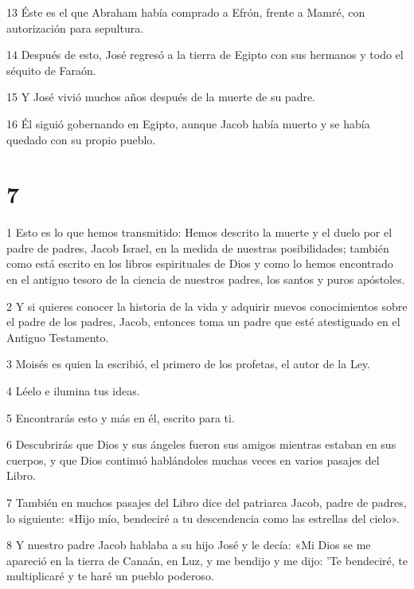 \par 13 Éste es el que Abraham había comprado a Efrón, frente a Mamré, con autorización para sepultura.

\par 14 Después de esto, José regresó a la tierra de Egipto con sus hermanos y todo el séquito de Faraón.

\par 15 Y José vivió muchos años después de la muerte de su padre.

\par 16 Él siguió gobernando en Egipto, aunque Jacob había muerto y se había quedado con su propio pueblo.

\chapter{7}

\par 1 Esto es lo que hemos transmitido: Hemos descrito la muerte y el duelo por el padre de padres, Jacob Israel, en la medida de nuestras posibilidades; también como está escrito en los libros espirituales de Dios y como lo hemos encontrado en el antiguo tesoro de la ciencia de nuestros padres, los santos y puros apóstoles.

\par 2 Y si quieres conocer la historia de la vida y adquirir nuevos conocimientos sobre el padre de los padres, Jacob, entonces toma un padre que esté atestiguado en el Antiguo Testamento.

\par 3 Moisés es quien la escribió, el primero de los profetas, el autor de la Ley.

\par 4 Léelo e ilumina tus ideas.

\par 5 Encontrarás esto y más en él, escrito para ti.

\par 6 Descubrirás que Dios y sus ángeles fueron sus amigos mientras estaban en sus cuerpos, y que Dios continuó hablándoles muchas veces en varios pasajes del Libro.

\par 7 También en muchos pasajes del Libro dice del patriarca Jacob, padre de padres, lo siguiente: «Hijo mío, bendeciré a tu descendencia como las estrellas del cielo».

\par 8 Y nuestro padre Jacob hablaba a su hijo José y le decía: «Mi Dios se me apareció en la tierra de Canaán, en Luz, y me bendijo y me dijo: 'Te bendeciré, te multiplicaré y te haré un pueblo poderoso.

